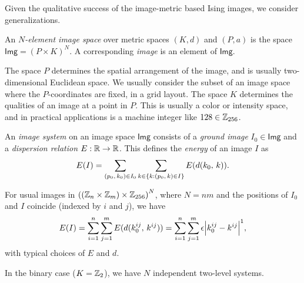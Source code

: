 \documentclass[../notebook.tex]{subfiles}
\newcommand{\imsp}{\mathsf{Img}}
\begin{document}

Given the qualitative success of the image-metric based Ising images, we
consider generalizations.

\begin{defn}
  An \emph{$N$-element image space} over metric spaces $(K, d)$ and $(P, a)$ is
  the space $\imsp = {(P \times K)}^N$. A corresponding \emph{image} is an
  element of $\imsp$.

  The space $P$ determines the spatial arrangement of the image, and is usually
  two-dimensional Euclidean space. We usually consider the subset of an image
  space where the $P$-coordinates are fixed, in a grid layout. The space $K$
  determines the qualities of an image at a point in $P$. This is usually a
  color or intensity space, and in practical applications is a machine integer
  like $128 \in \mathbb{Z}_{256}$.
\end{defn}

\begin{defn}
  An \emph{image system} on an image space $\imsp$ consists of a \emph{ground
  image} $I_0 \in \imsp$ and a \emph{dispersion relation} $E:\mathbb{R} \to \mathbb{R}$. This
  defines the \emph{energy} of an image $I$ as
  \[
    E(I)
    = \sum_{(p_0,\, k_0) \in I_0}
    \sum_{k \in \qty{k : (p_0,\, k) \in I}}
    E(d(k_0,\, k)).
  \]
\end{defn}

\begin{eg}
  For usual images in ${((\mathbb{Z}_n \times \mathbb{Z}_m) \times \mathbb{Z}_{256})}^N$, where $N =
  nm$ and the positions of $I_0$ and $I$ coincide (indexed by $i$ and $j$), we
  have
  \[
    E(I)
    = \sum_{i = 1}^n \sum_{j = 1}^m E(d(k_0^{ij},\, k^{ij}))
    = \sum_{i = 1}^n \sum_{j = 1}^m \epsilon\abs{k_0^{ij} - k^{ij}}^1,
  \]
  with typical choices of $E$ and $d$.
\end{eg}

In the binary case ($K = \mathbb{Z}_2$), we have $N$ independent two-level
systems.
\end{document}
